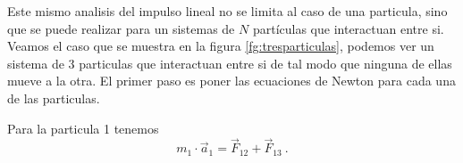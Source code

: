 \documentclass[../Main.tex]{subfiles}
\begin{document}
\begin{minipage}[t]{0.6\textwidth}
Este mismo analisis del impulso lineal no se limita al caso de una particula,
sino que se puede realizar para un sistemas de $N$ partículas que interactuan
entre si.
Veamos el caso que se muestra en la figura \ref{fg:tresparticulas}, podemos ver
un sistema de 3 particulas que interactuan entre si de tal modo que ninguna de
ellas mueve a la otra. El primer paso es poner las ecuaciones de Newton para
cada una de las particulas.

Para la particula 1 tenemos
\begin{equation*}
    m_1 \cdot \vec{a} _1 = \vec{F} _{12} + \vec{F} _{13} \ .
\end{equation*}

\end{minipage}
\newpage
\begin{minipage}[t]{0.3\textwidth}
\end{minipage}
\hfill
\end{document}

